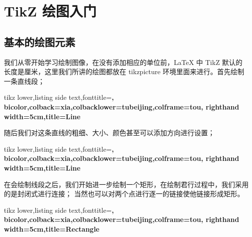 \documentclass[cn,11pt, simple]{elegantbook}
\begin{document}


\newpage

\tableofcontents

\mainmatter
\hypersetup{pageanchor=true}

\chapter{TikZ 绘图入门}

\section{基本的绘图元素}

\begin{tcolorbox}
我们从零开始学习绘制图像，在没有添加相应的单位前，\LaTeX{} 中 TikZ 默认的长度是厘米，这里我们所讲的绘图都放在 tikzpicture 环境里面来进行。首先绘制一条直线段；
\end{tcolorbox}

\begin{tcblisting}{tikz lower,listing side text,fonttitle=\bfseries,
	bicolor,colback=xia,colbacklower=tubeijing,colframe=tou,
	righthand width=5cm,title=Line}
\end{tcblisting}

随后我们对这条直线的粗细、大小、颜色甚至可以添加方向进行设置；

\begin{tcblisting}{tikz lower,listing side text,fonttitle=\bfseries,
	bicolor,colback=xia,colbacklower=tubeijing,colframe=tou,
	righthand width=5cm,title=Line}
\end{tcblisting}

在会绘制线段之后，我们开始进一步绘制一个矩形，在绘制君行过程中，我们采用的是封闭式进行连接；
当然也可以对两个点进行逐一的链接使他链接形成矩形。

\begin{tcblisting}{tikz lower,listing side text,fonttitle=\bfseries,
	bicolor,colback=xia,colbacklower=tubeijing,colframe=tou,
	righthand width=5cm,title=Rectangle}
\end{tcblisting}
\end{document}
